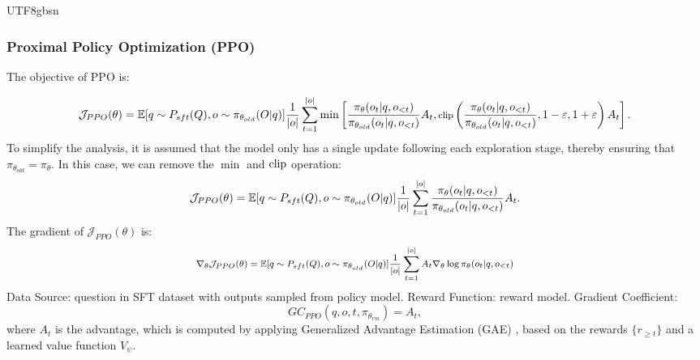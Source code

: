 \documentclass[11pt, a4paper, logo, copyright, nonumbering]{deepseek}
\renewcommand{\epsilon}{\varepsilon}
\begin{document}
\begin{CJK*}{UTF8}{gbsn}
\subsubsection{Proximal Policy Optimization (PPO)}
The objective of PPO is:

\begin{equation}
\footnotesize
    \mathcal{J}_{PPO}(\theta) = \mathbb{E}{[q \sim P_{sft}(Q), o \sim \pi_{\theta_{old}}(O|q)]} \frac{1}{|o|} \sum_{t=1}^{|o|} \min \left[ \frac{\pi_\theta(o_{t} | q, o_{<t})}{\pi_{\theta_{old}}(o_{t} | q, o_{<t})} A_{t}, \text{clip} \left( \frac{\pi_\theta(o_{t} | q, o_{<t})}{\pi_{\theta_{old}}(o_{t} | q, o_{<t})}, 1 - \epsilon, 1 + \epsilon \right)  A_{t} \right].
\end{equation}
To simplify the analysis,  it is assumed that the model only has a single update following each exploration stage, thereby ensuring that $\pi_{\theta_{old}} = \pi_{\theta}$.
In this case, we can remove the $\min$ and ${\rm clip}$ operation:
\begin{equation}
\footnotesize
    \mathcal{J}_{PPO}(\theta) = \mathbb{E}{[q \sim P_{sft}(Q), o \sim \pi_{\theta_{old}}(O|q)]} \frac{1}{|o|} \sum_{t=1}^{|o|} \frac{\pi_\theta(o_{t} | q, o_{<t})}{\pi_{\theta_{old}}(o_{t} | q, o_{<t})} A_{t}.
\end{equation}
The gradient of $\mathcal{J}_{PPO}(\theta)$ is:
\begin{equation}
\footnotesize
\begin{split}
    \nabla_{\theta}\mathcal{J}_{PPO}(\theta) = \mathbb{E}{[q \sim P_{sft}(Q), o \sim \pi_{\theta_{old}}(O|q)]} \frac{1}{|o|} \sum_{t=1}^{|o|} A_t \nabla_{\theta}\log \pi_\theta(o_{t} | q, o_{<t})
\end{split}
\end{equation}
Data Source:  question in SFT dataset with outputs sampled from policy model.
Reward Function: reward model.
Gradient Coefficient:
\begin{equation}
    GC_{PPO}(q, o, t, \pi_{\theta_{rm}}) = A_t,
\label{eq:GC-PPO}
\end{equation}
where $A_t$ is the advantage, which is computed by applying Generalized Advantage Estimation (GAE) \citep{gae}, based on the rewards  $\{r_{\ge t}\}$  and a learned value function  $V_{\psi}$. 



\end{CJK*}
\end{document}
